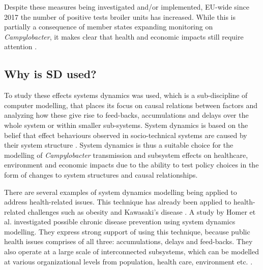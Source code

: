 Despite these measures being investigated and/or implemented, EU-wide since 2017 the number of positive tests broiler units has increased. While this is partially a consequence of member states expanding monitoring on \textit{Campylobacter}, it makes clear that health and economic impacts still require attention \parencite{nastasijevic_european_2020}.

\subsection*{Why is SD used?}

To study these effects systems dynamics was used, which is a sub-discipline of computer modelling, that places its focus on causal relations between factors and analyzing how these give rise to feed-backs, accumulations and delays over the whole system or within smaller sub-systems. System dynamics is based on the belief that effect behaviours observed in socio-technical systems are caused by their system structure \parencite{pruyt_triple_2013}. System dynamics is thus a suitable choice for the modelling of \textit{Campylobacter} transmission and subsystem effects on healthcare, environment and economic impacts due to the ability to test policy choices in the form of changes to system structures and causal relationships.

There are several examples of system dynamics modelling being applied to address health-related issues. This technique has already been applied to health-related challenges such as obesity \parencite{chen_obesity_2018} and Kawasaki's disease \parencite{huang_epidemiology_2013}. 
A study by Homer et al. investigated possible chronic disease prevention using system dynamics modelling. They express strong support of using this technique, because public health issues comprises of all three: accumulations, delays and feed-backs. They also operate at a large scale of interconnected subsystems, which can be modelled at various organizational levels from population, health care, environment etc. \parencite{homer_system_2006}. 



